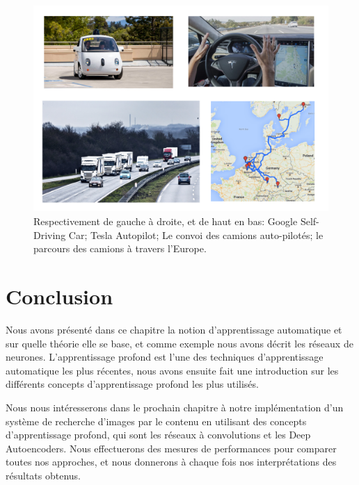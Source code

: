 \begin{figure}[H]
	\centering
		\includegraphics[width=5in]{Figures/selfDriving.png}
	\caption[An Electron]{Respectivement de gauche à droite, et de haut en bas: Google Self-Driving Car; Tesla Autopilot; Le convoi des camions auto-pilotés; le parcours des camions à travers l'Europe.}
	\label{fig:Electron}
\end{figure}


\section{Conclusion}

	Nous avons présenté dans ce chapitre la notion d'apprentissage automatique et sur quelle théorie elle se base, et comme exemple nous avons décrit les réseaux de neurones. L'apprentissage profond est l'une des techniques d'apprentissage automatique les plus récentes, nous avons ensuite fait une introduction sur les différents concepts d'apprentissage profond les plus utilisés.
	
	Nous nous intéresserons dans le prochain chapitre à notre implémentation d'un système de recherche d'images par le contenu en utilisant des concepts d'apprentissage profond, qui sont les réseaux à convolutions et les Deep Autoencoders. Nous effectuerons des mesures de performances pour comparer toutes nos approches, et nous donnerons à chaque fois nos interprétations des résultats obtenus.

